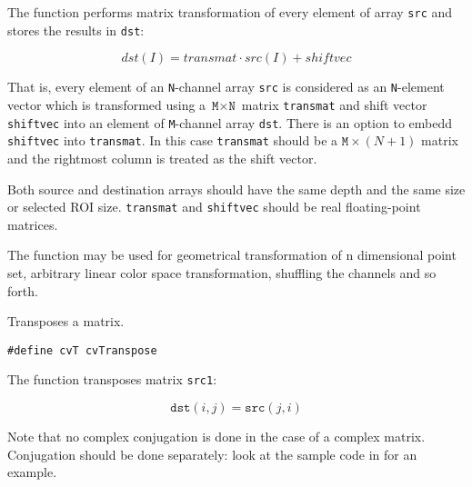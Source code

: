 \begin{description}
\end{description}

The function performs matrix transformation of every element of array \texttt{src} and stores the results in \texttt{dst}:

\[
dst(I) = transmat \cdot src(I) + shiftvec %
\]

That is, every element of an \texttt{N}-channel array \texttt{src} is
considered as an \texttt{N}-element vector which is transformed using
a $\texttt{M} \times \texttt{N}$ matrix \texttt{transmat} and shift
vector \texttt{shiftvec} into an element of \texttt{M}-channel array
\texttt{dst}. There is an option to embedd \texttt{shiftvec} into
\texttt{transmat}. In this case \texttt{transmat} should be a $\texttt{M}
\times (N+1)$ matrix and the rightmost column is treated as the shift
vector.

Both source and destination arrays should have the same depth and the
same size or selected ROI size. \texttt{transmat} and \texttt{shiftvec}
should be real floating-point matrices.

The function may be used for geometrical transformation of n dimensional
point set, arbitrary linear color space transformation, shuffling the
channels and so forth.

Transposes a matrix.


\begin{lstlisting}
#define cvT cvTranspose
\end{lstlisting}

\begin{description}
\end{description}

The function transposes matrix \texttt{src1}:

\[ \texttt{dst}(i,j) = \texttt{src}(j,i) \]

Note that no complex conjugation is done in the case of a complex
matrix. Conjugation should be done separately: look at the sample code
in  for an example.

